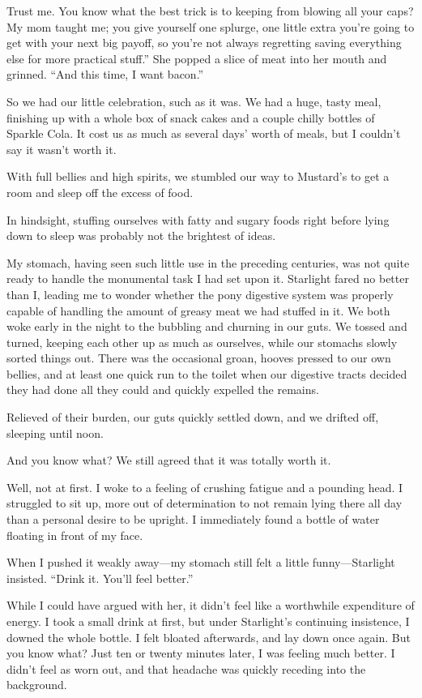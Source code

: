 \leavevmode{}Trust me. You know what the best trick is to keeping from blowing all your caps? My mom taught me; you give yourself one splurge, one little extra you’re going to get with your next big payoff, so you’re not always regretting saving everything else for more practical stuff.” She popped a slice of meat into her mouth and grinned. “And this time, I want bacon.”

So we had our little celebration, such as it was. We had a huge, tasty meal, finishing up with a whole box of snack cakes and a couple chilly bottles of Sparkle Cola. It cost us as much as several days’ worth of meals, but I couldn’t say it wasn’t worth it.

With full bellies and high spirits, we stumbled our way to Mustard’s to get a room and sleep off the excess of food.

{\br}%
In hindsight, stuffing ourselves with fatty and sugary foods right before lying down to sleep was probably not the brightest of ideas.

My stomach, having seen such little use in the preceding centuries, was not quite ready to handle the monumental task I had set upon it. Starlight fared no better than I, leading me to wonder whether the pony digestive system was properly capable of handling the amount of greasy meat we had stuffed in it. We both woke early in the night to the bubbling and churning in our guts. We tossed and turned, keeping each other up as much as ourselves, while our stomachs slowly sorted things out. There was the occasional groan, hooves pressed to our own bellies, and at least one quick run to the toilet when our digestive tracts decided they had done all they could and quickly expelled the remains.

Relieved of their burden, our guts quickly settled down, and we drifted off, sleeping until noon.

And you know what? We still agreed that it was totally worth it.

Well, not at first. I woke to a feeling of crushing fatigue and a pounding head. I struggled to sit up, more out of determination to not remain lying there all day than a personal desire to be upright. I immediately found a bottle of water floating in front of my face.

When I pushed it weakly away—my stomach still felt a little funny—Starlight insisted. “Drink it. You’ll feel better.”

While I could have argued with her, it didn’t feel like a worthwhile expenditure of energy. I took a small drink at first, but under Starlight’s continuing insistence, I downed the whole bottle. I felt bloated afterwards, and lay down once again. But you know what? Just ten or twenty minutes later, I was feeling much better. I didn’t feel as worn out, and that headache was quickly receding into the background.

